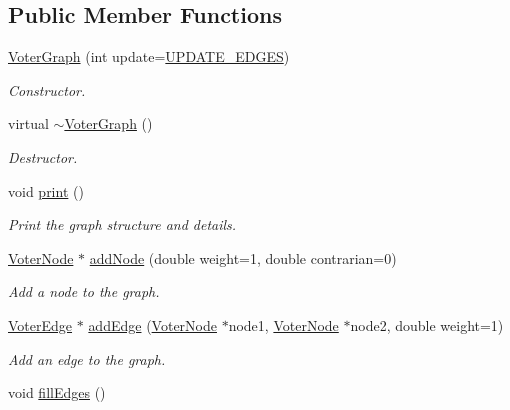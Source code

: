 \subsection*{Public Member Functions}
\begin{DoxyCompactItemize}
\item 
\hyperlink{classVoterGraph_aa5e00e0f2d2d8de10a217633d4594814}{Voter\-Graph} (int update=\hyperlink{voter__graph_8hpp_ab3bec55c359e4ed771339c8bc61fc35aa01d100088352e1a7d3a34c9a66d0f951}{U\-P\-D\-A\-T\-E\-\_\-\-E\-D\-G\-E\-S})
\begin{DoxyCompactList}\small\item\em Constructor. \end{DoxyCompactList}\item 
\hypertarget{classVoterGraph_a84a3f081c6e15cf8d1635d6ee6d5e51e}{virtual \hyperlink{classVoterGraph_a84a3f081c6e15cf8d1635d6ee6d5e51e}{$\sim$\-Voter\-Graph} ()}\label{classVoterGraph_a84a3f081c6e15cf8d1635d6ee6d5e51e}

\begin{DoxyCompactList}\small\item\em Destructor. \end{DoxyCompactList}\item 
\hypertarget{classVoterGraph_aacb7bbd4bcc7f923b2784b0bcefcd1a3}{void \hyperlink{classVoterGraph_aacb7bbd4bcc7f923b2784b0bcefcd1a3}{print} ()}\label{classVoterGraph_aacb7bbd4bcc7f923b2784b0bcefcd1a3}

\begin{DoxyCompactList}\small\item\em Print the graph structure and details. \end{DoxyCompactList}\item 
\hyperlink{classVoterNode}{Voter\-Node} $\ast$ \hyperlink{classVoterGraph_af53017970f3ac08838b67f4a09171b92}{add\-Node} (double weight=1, double contrarian=0)
\begin{DoxyCompactList}\small\item\em Add a node to the graph. \end{DoxyCompactList}\item 
\hyperlink{classVoterEdge}{Voter\-Edge} $\ast$ \hyperlink{classVoterGraph_a1f6b8be82800577c45908102251f1e35}{add\-Edge} (\hyperlink{classVoterNode}{Voter\-Node} $\ast$node1, \hyperlink{classVoterNode}{Voter\-Node} $\ast$node2, double weight=1)
\begin{DoxyCompactList}\small\item\em Add an edge to the graph. \end{DoxyCompactList}\item 
\hypertarget{classVoterGraph_aa86a23e7d5984c3c6bbea76f193b73ae}{void \hyperlink{classVoterGraph_aa86a23e7d5984c3c6bbea76f193b73ae}{fill\-Edges} ()}\label{classVoterGraph_aa86a23e7d5984c3c6bbea76f193b73ae}


\end{DoxyCompactItemize}
